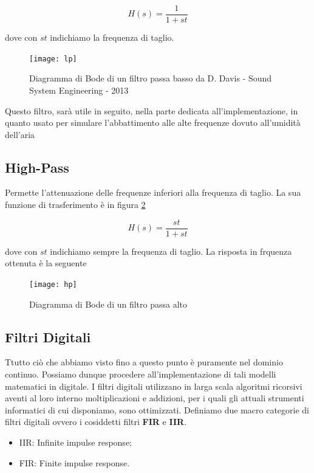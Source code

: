 \begin{equation}
H(s)=\frac{1}{1+st}
\end{equation}

dove con $st$ indichiamo la frequenza di taglio.

\begin{figure}[h]
\centering
\texttt{[image: lp]}
\caption{Diagramma di Bode di un filtro passa basso \newline \scriptsize{ da D. Davis - Sound System Engineering - 2013}}
\label{fig:lp}
\end{figure}

Questo filtro, sarà utile in seguito, nella parte dedicata all'implementazione, in quanto 
usato per simulare l'abbattimento alle alte frequenze dovuto all'umidità dell'aria

\subsection{High-Pass}

Permette l’attenuazione delle frequenze inferiori alla frequenza di taglio.
La sua funzione di trasferimento è in figura \ref{fig:hp}

\begin{equation}
H(s)=\frac{st}{1+st}
\end{equation}

dove con $st$ indichiamo sempre la frequenza di taglio.
La risposta in frquenza ottenuta è la seguente

\begin{figure}[htp]
\centering
\texttt{[image: hp]}
\caption{Diagramma di Bode di un filtro passa alto}
\label{fig:hp}
\end{figure}

\subsection{Filtri Digitali}

Ttutto ciò che abbiamo visto fino a questo punto è puramente nel dominio
continuo. Possiamo dunque procedere all’implementazione di tali modelli
matematici in digitale. I filtri digitali utilizzano in larga scala algoritmi
ricorsivi aventi al loro interno moltiplicazioni e addizioni, per i quali gli
attuali strumenti informatici di cui disponiamo, sono ottimizzati. Definiamo
due macro categorie di filtri digitali ovvero i cosiddetti filtri \textbf{FIR}
e \textbf{IIR}.

\begin{itemize}
\item IIR: Infinite impulse response;
\item FIR: Finite impulse response.
\end{itemize}


